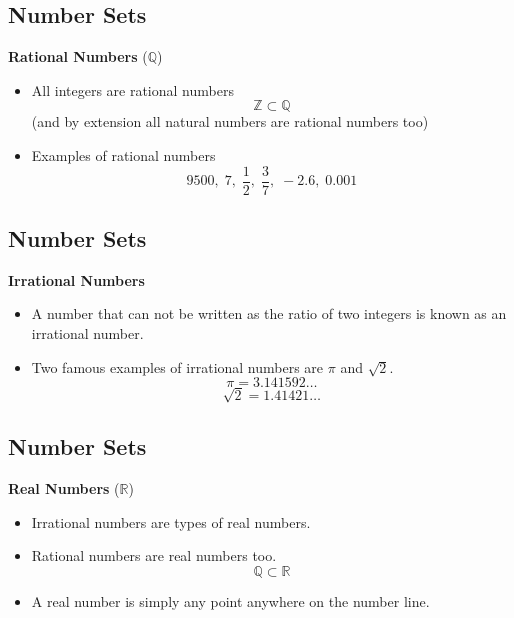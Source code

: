 \documentclass[]{report}
\begin{document}

\subsection{Number Sets}

\textbf{Rational Numbers} ($\mathbb{Q}$)
   \begin{itemize}
   \item All integers are rational numbers 
   \[ \mathbb{Z}  \subset \mathbb{Q}\]
   (and by extension all natural numbers are rational numbers too)
   \item Examples of rational numbers
   \[ 9500,\;7,\; \frac{1}{2} ,\; \frac{3}{7},\; -2.6 ,\; 0.001\] 
   \end{itemize}
   
   
   \subsection{Number Sets}
   
   \textbf{Irrational Numbers} 
      \begin{itemize}
   \item A number that can not be written as the ratio of two integers is known as an irrational number.
   \item Two famous examples of irrational numbers are $\pi$ and $\sqrt{2}$. 
   \[\pi = 3.141592\ldots\]
   \[\sqrt{2} = 1.41421\ldots\]
   \end{itemize}
    

\subsection{Number Sets}

\textbf{Real Numbers} ($\mathbb{R}$)
\begin{itemize}
\item Irrational numbers are types of real numbers.
\item Rational numbers are real numbers too.
\[ \mathbb{Q}  \subset \mathbb{R}\]

\item A real number is simply any point anywhere on the number line.
   \end{itemize}
    
\end{document}
